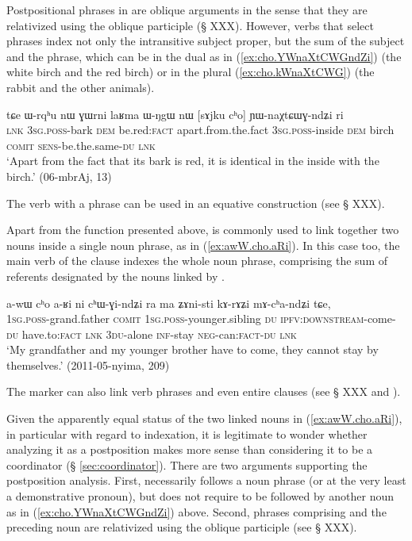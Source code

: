 Postpositional phrases in  are oblique arguments in the sense that they are relativized using the oblique participle (§ XXX). However, verbs that select  phrases index not only the intransitive subject proper, but the sum of the subject and the  phrase, which can be in the dual as in (\ref{ex:cho.YWnaXtCWGndZi}) (the white birch and the red birch) or in the plural (\ref{ex:cho.kWnaXtCWG}) (the rabbit and the other animals). 

\begin{exe}
\ex \label{ex:cho.YWnaXtCWGndZi}
\gll tɕe ɯ-rqʰu nɯ ɣɯrni laʁma ɯ-ŋgɯ nɯ [sɤjku cʰo] ɲɯ-naχtɕɯɣ-ndʑi ri\\
\textsc{lnk} \textsc{3sg}.\textsc{poss}-bark \textsc{dem} be.red:\textsc{fact} apart.from.the.fact \textsc{3sg}.\textsc{poss}-inside \textsc{dem} birch \textsc{comit} \textsc{sens}-be.the.same-\textsc{du} \textsc{lnk} \\
\glt `Apart from the fact that its bark is red, it is identical in the inside with the birch.' (06-mbrAj, 13)
\end{exe}

The verb  with a  phrase can be used in an equative construction (see § XXX).

 Apart from the function presented above,  is commonly used to link together two nouns inside a single noun phrase, as in (\ref{ex:awW.cho.aRi}). In this case too, the main verb of the clause indexes the whole noun phrase, comprising the sum of referents designated by the nouns linked by .

\begin{exe}
\ex \label{ex:awW.cho.aRi}
\gll a-wɯ cʰo a-ʁi ni cʰɯ-ɣi-ndʑi ra ma ʑɤni-sti kɤ-rɤʑi mɤ-cʰa-ndʑi tɕe, \\
\textsc{1sg}.\textsc{poss}-grand.father \textsc{comit} \textsc{1sg}.\textsc{poss}-younger.sibling \textsc{du} \textsc{ipfv}:\textsc{downstream}-come-\textsc{du} have.to:\textsc{fact} \textsc{lnk} \textsc{3du}-alone \textsc{inf}-stay \textsc{neg}-can:\textsc{fact}-\textsc{du} \textsc{lnk} \\ 
\glt `My grandfather and my younger brother have to come, they cannot stay by themselves.' (2011-05-nyima, 209)
\end{exe}

The marker  can also link verb phrases and even entire clauses (see § XXX and \citealt[313]{jacques14linking}).

Given the apparently equal status of the two linked nouns in (\ref{ex:awW.cho.aRi}), in particular with regard to indexation, it is legitimate to wonder whether analyzing it as a postposition makes more sense than considering it to be a coordinator (§ \ref{sec:coordinator}). There are two arguments supporting the postposition analysis. First,  necessarily follows a noun phrase (or at the very least a demonstrative pronoun), but does not require to be followed by another noun as in (\ref{ex:cho.YWnaXtCWGndZi}) above. Second, phrases comprising  and the preceding noun are relativized using the oblique participle (see § XXX).

